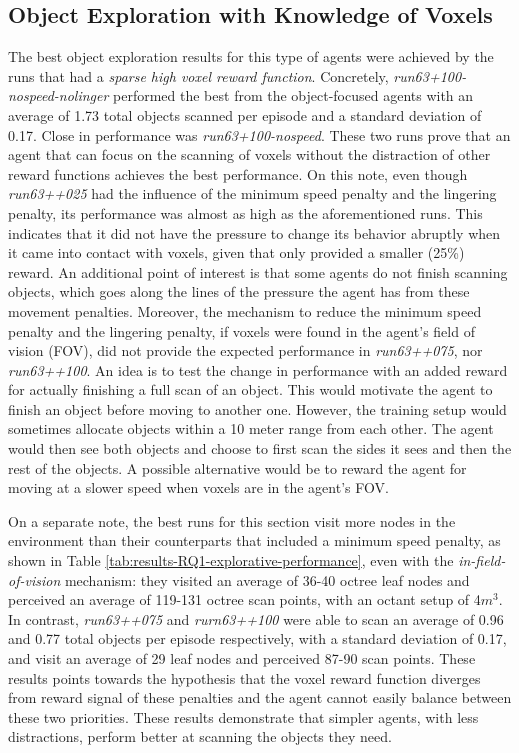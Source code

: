     \subsection{Object Exploration with Knowledge of Voxels} 
        The best object exploration results for this type of agents were achieved by the runs that had a \textit{sparse high voxel reward function}. %
        Concretely, \textit{run63+100-nospeed-nolinger} performed the best from the object-focused agents with an average of 1.73 total objects scanned per episode and a standard deviation of 0.17. Close in performance was \textit{run63+100-nospeed}. These two runs prove that an agent that can focus on the scanning of voxels without the distraction of other reward functions achieves the best performance. On this note, even though \textit{run63++025} had the influence of the minimum speed penalty and the lingering penalty, its performance was almost as high as the aforementioned runs. This indicates that it did not have the pressure to change its behavior abruptly when it came into contact with voxels, given that only provided a smaller (25\%) reward.
        An additional point of interest is that some agents do not finish scanning objects, which goes along the lines of the pressure the agent has from these movement penalties. 
        Moreover, the mechanism to reduce the minimum speed penalty and the lingering penalty, if voxels were found in the agent's field of vision (FOV), did not provide the expected performance in \textit{run63++075}, nor \textit{run63++100}.
        An idea is to test the change in performance with an added reward for actually finishing a full scan of an object. This would motivate the agent to finish an object before moving to another one. However, the training setup would sometimes allocate objects within a 10 meter range from each other. The agent would then see both objects and choose to first scan the sides it sees and then the rest of the objects. A possible alternative would be to reward the agent for moving at a slower speed when voxels are in the agent's FOV.
       
        On a separate note, the best runs for this section visit more nodes in the environment than their counterparts that included a minimum speed penalty, as shown in Table \ref{tab:results-RQ1-explorative-performance}, even with the \textit{in-field-of-vision} mechanism: they visited an average of 36-40 octree leaf nodes and perceived an average of 119-131 octree scan points, with an octant setup of 4$m^3$.
        In contrast, \textit{run63++075} and \textit{rurn63++100} were able to scan an average of 0.96 and 0.77 total objects per episode respectively, with a standard deviation of 0.17, and visit an average of  29 leaf nodes and perceived 87-90 scan points. 
        These results points towards the hypothesis that the voxel reward function diverges from reward signal of these penalties and the agent cannot easily balance between these two priorities.  
        These results demonstrate that simpler agents, with less distractions, perform better at scanning the objects they need. 
        

